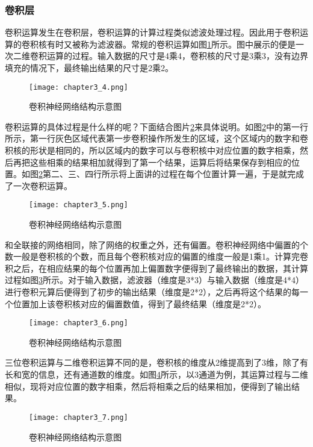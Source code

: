 \subsubsection{卷积层}
卷积运算发生在卷积层，卷积运算的计算过程类似滤波处理过程。因此用于卷积运算的卷积核有时又被称为滤波器。常规的卷积运算如图\ref{fig:chapter3_4}所示。图中展示的便是一次二维卷积运算的过程。输入数据的尺寸是4乘4，卷积核的尺寸是3乘3，没有边界填充的情况下，最终输出结果的尺寸是2乘2。
\begin{figure}
    \centering
    \texttt{[image: chapter3\_4.png]}
    \caption{卷积神经网络结构示意图}
    \label{fig:chapter3_4}
\end{figure}
卷积运算的具体过程是什么样的呢？下面结合图片\ref{fig:chapter3_5}来具体说明。如图\ref{fig:chapter3_5}中的第一行所示，第一行灰色区域代表第一步卷积操作所发生的区域，这个区域内的数字和卷积核的形状是相同的，所以区域内的数字可以与卷积核中对应位置的数字相乘，然后再把这些相乘的结果相加就得到了第一个结果，运算后将结果保存到相应的位置。如图\ref{fig:chapter3_5}第二、三、四行所示将上面讲的过程在每个位置计算一遍，于是就完成了一次卷积运算。
\begin{figure}
    \centering
    \texttt{[image: chapter3\_5.png]}
    \caption{卷积神经网络结构示意图}
    \label{fig:chapter3_5}
\end{figure}
和全联接的网络相同，除了网络的权重之外，还有偏置。卷积神经网络中偏置的个数一般是卷积核的个数，而且每个卷积核对应的偏置的维度一般是1乘1。计算完卷积之后，在相应结果的每个位置再加上偏置数字便得到了最终输出的数据，其计算过程如图\ref{fig:chapter3_6}所示。对于输入数据，滤波器（维度是3*3）与输入数据（维度是4*4）进行卷积元算后便得到了初步的输出结果（维度是2*2），之后再将这个结果的每一个位置加上该卷积核对应的偏置数值，得到了最终结果（维度是2*2）。
\begin{figure}
    \centering
    \texttt{[image: chapter3\_6.png]}
    \caption{卷积神经网络结构示意图}
    \label{fig:chapter3_6}
\end{figure}
三位卷积运算与二维卷积运算不同的是，卷积核的维度从2维提高到了3维，除了有长和宽的信息，还有通道数的维度。如图\ref{fig:chapter3_7}所示，以3通道为例，其运算过程与二维相似，现将对应位置的数字相乘，然后将相乘之后的结果相加，便得到了输出结果。
\begin{figure}
    \centering
    \texttt{[image: chapter3\_7.png]}
    \caption{卷积神经网络结构示意图}
    \label{fig:chapter3_7}
\end{figure}

